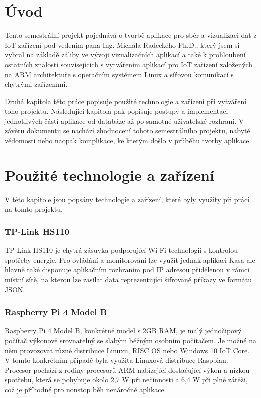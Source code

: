 \documentclass[czech,master,dept460,male,cpp,cpdeclaration,oneside]{diploma}
\begin{document}
\MakeTitlePages

\section{Úvod}
\label{sec:Introduction}
Tento semestrální projekt pojednává o tvorbě aplikace pro sběr a vizualizaci dat z IoT zařízení pod vedením pana Ing. Michala Radeckého Ph.D., který jsem si vybral na základě záliby ve vývoji vizualizačních aplikací a také k prohloubení ostatních znalostí souvisejících s vytvářením aplikací pro IoT zařízení založených na ARM architektuře s operačním systémem Linux a síťovou komunikací s chytrými zařízeními.

Druhá kapitola této práce popisuje použité technologie a zařízení při vytváření toho projektu. Následující kapitola pak popisuje postupy a implementaci jednotlivých částí aplikace od databáze až po samotné uživatelské rozhraní. V závěru dokumentu se nachází zhodnocení tohoto semestrálního projektu, nabyté vědomosti nebo naopak komplikace, ke kterým došlo v průběhu tvorby aplikace.

\clearpage

\section{Použité technologie a zařízení}
V této kapitole jsou popsány technologie a zařízení, které byly využity při práci na tomto projektu.

\subsubsection*{TP-Link HS110}
TP-Link HS110\autocite{HS110} je chytrá zásuvka podporující Wi-Fi technologii s kontrolou spotřeby energie. Pro ovládání a monitorování lze využít jednak aplikaci Kasa ale hlavně také disponuje aplikačním rozhraním pod IP adresou přidělenou v rámci místní sítě, na kterou lze zasílat data reprezentující šifrované příkazy ve formátu JSON.

\subsubsection*{Raspberry Pi 4 Model B}
Raspberry Pi 4 Model B\autocite{PI}, konkrétně model s 2GB RAM, je malý jednočipový počítač výkonově srovnatelný se slabým běžným osobním počítačem. Je možné na něm provozovat různé distribuce Linuxu, RISC OS nebo Windows 10 IoT Core. V tomto konkrétním případě byla využita Linuxová distribuce Raspbian. Procesor pochází z rodiny procesorů ARM nabízející dostačující výkon a nízkou spotřebu, která se pohybuje okolo 2,7 W při nečinnosti a 6,4 W při plné zátěži, což je příhodné pro nonstop běh nenáročné aplikace.
\end{document}
